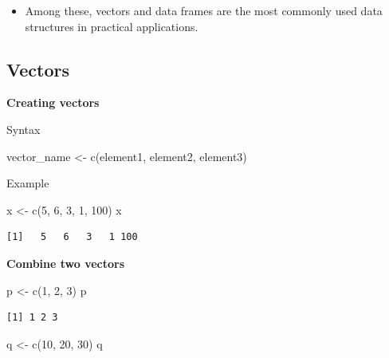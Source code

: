 \documentclass[
  letterpaper,
  DIV=11,
  numbers=noendperiod]{scrreprt}
\newenvironment{Shaded}{\begin{snugshade}}{\end{snugshade}}
\newcommand{\DecValTok}[1]{\textcolor[rgb]{0.68,0.00,0.00}{#1}}
\newcommand{\FunctionTok}[1]{\textcolor[rgb]{0.28,0.35,0.67}{#1}}
\newcommand{\NormalTok}[1]{\textcolor[rgb]{0.00,0.23,0.31}{#1}}
\newcommand{\OtherTok}[1]{\textcolor[rgb]{0.00,0.23,0.31}{#1}}
\providecommand{\tightlist}{%
  \setlength{\itemsep}{0pt}\setlength{\parskip}{0pt}}\usepackage{longtable,booktabs,array}
\begin{document}
\begin{itemize}
\tightlist
\item
  Among these, vectors and data frames are the most commonly used data
  structures in practical applications.
\end{itemize}

\subsection{Vectors}\label{vectors}

\textbf{Creating vectors}

Syntax

\begin{Shaded}
\begin{Highlighting}[]
\NormalTok{vector\_name }\OtherTok{\textless{}{-}} \FunctionTok{c}\NormalTok{(element1, element2, element3)}
\end{Highlighting}
\end{Shaded}

Example

\begin{Shaded}
\begin{Highlighting}[]
\NormalTok{x }\OtherTok{\textless{}{-}} \FunctionTok{c}\NormalTok{(}\DecValTok{5}\NormalTok{, }\DecValTok{6}\NormalTok{, }\DecValTok{3}\NormalTok{, }\DecValTok{1}\NormalTok{, }\DecValTok{100}\NormalTok{)}
\NormalTok{x}
\end{Highlighting}
\end{Shaded}

\begin{verbatim}
[1]   5   6   3   1 100
\end{verbatim}

\textbf{Combine two vectors}

\begin{Shaded}
\begin{Highlighting}[]
\NormalTok{p }\OtherTok{\textless{}{-}} \FunctionTok{c}\NormalTok{(}\DecValTok{1}\NormalTok{, }\DecValTok{2}\NormalTok{, }\DecValTok{3}\NormalTok{)}
\NormalTok{p}
\end{Highlighting}
\end{Shaded}

\begin{verbatim}
[1] 1 2 3
\end{verbatim}

\begin{Shaded}
\begin{Highlighting}[]
\NormalTok{q }\OtherTok{\textless{}{-}} \FunctionTok{c}\NormalTok{(}\DecValTok{10}\NormalTok{, }\DecValTok{20}\NormalTok{, }\DecValTok{30}\NormalTok{)}
\NormalTok{q}
\end{Highlighting}
\end{Shaded}
\end{document}
